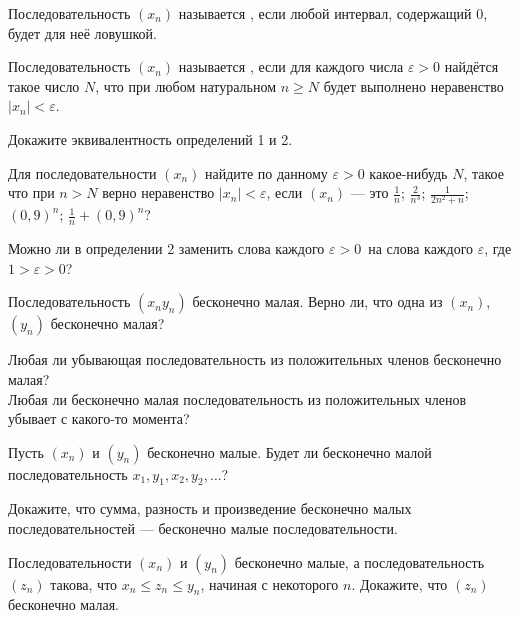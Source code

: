 \documentclass[a4paper,11pt]{article}
\begin{document}



 Последовательность $(x_n)$ называется , если
любой интервал, содержащий 0, будет для неё ловушкой.


 Последовательность $(x_n)$ называется , если
для каждого числа $\varepsilon>0$ найд\"ется такое число $N$,
что при любом натуральном $n\geq N$ будет выполнено неравенство $|x_n|<\varepsilon$.

Докажите эквивалентность определений 1 и 2.

Для %
последовательности $(x_n)$ найдите
по данному $\varepsilon>0$ какое-нибудь $N$,
такое что при $n>N$ верно  неравенство
$|x_n|<\varepsilon$, если $(x_n)$ --- это
 $\frac1n$;
 $\frac2{n^3}$;
 $\frac1{2n^2+n}$;
 $(0,9)^n$;
 $\frac1n+(0,9)^n$?

Можно ли в определении 2 заменить слова  каждого $\varepsilon>0$\
на слова  каждого $\varepsilon$, где $1>\varepsilon>0$?

Последовательность $(x_ny_n)$ бесконечно малая.
Верно ли, что одна из $(x_n)$, $(y_n)$
бесконечно малая?

 Любая ли убывающая последовательность из положительных членов бесконечно малая?\\
\пункт Любая ли бесконечно малая последовательность из положительных членов убывает с какого-то момента?
\кзадача


Пусть $(x_n)$ и $(y_n)$
бесконечно малые. %
Будет ли бесконечно малой последовательность $x_1,y_1,x_2,y_2,\dots$?

Докажите, что сумма, разность и произведение бесконечно малых
последовательностей --- бесконечно малые последовательности.


 Последовательности $(x_n)$ и $(y_n)$
бесконечно малые, а последовательность
$(z_n)$ такова, что $x_n\leq z_n\leq y_n$, начиная с некоторого $n$. Докажите, что $(z_n)$ бесконечно малая.
\кзадача
\end{document}
